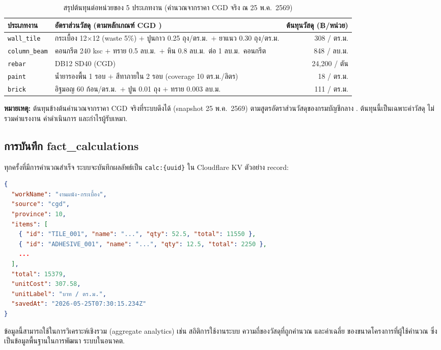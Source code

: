 \begin{table}[H]
\centering
\caption{สรุปต้นทุนต่อหน่วยของ 5 ประเภทงาน (คำนวณจากราคา CGD จริง ณ 25 พ.ค.\ 2569)}
\label{tab:boq-summary}
\begin{tabularx}{\textwidth}{l X r}
\toprule
\textbf{ประเภทงาน} & \textbf{อัตราส่วนวัสดุ (ตามหลักเกณฑ์ CGD \cite{cgd2569})} & \textbf{ต้นทุนวัสดุ (฿/หน่วย)} \\
\midrule
\texttt{wall\_tile}   & กระเบื้อง 12$\times$12 (waste 5\%) $+$ ปูนกาว 0.25 ถุง/ตร.ม.\ $+$ ยาแนว 0.30 ถุง/ตร.ม. & 308 / ตร.ม. \\
\texttt{column\_beam} & คอนกรีต 240 ksc $+$ ทราย 0.5 ลบ.ม.\ $+$ หิน 0.8 ลบ.ม.\ ต่อ 1 ลบ.ม.\ คอนกรีต & 848 / ลบ.ม. \\
\texttt{rebar}        & DB12 SD40 (CGD) & 24{,}200 / ตัน \\
\texttt{paint}        & น้ำยารองพื้น 1 รอบ $+$ สีทาภายใน 2 รอบ (coverage 10 ตร.ม./ลิตร) & 18 / ตร.ม. \\
\texttt{brick}        & อิฐมอญ 60 ก้อน/ตร.ม.\ $+$ ปูน 0.01 ถุง $+$ ทราย 0.003 ลบ.ม. & 111 / ตร.ม. \\
\bottomrule
\end{tabularx}
\end{table}

\textbf{หมายเหตุ:} ต้นทุนข้างต้นคำนวณจากราคา CGD จริงที่ระบบดึงได้ (snapshot 25 พ.ค.\ 2569) ตามสูตรอัตราส่วนวัสดุของกรมบัญชีกลาง \cite{cgd2569}. ต้นทุนนี้เป็นเฉพาะค่าวัสดุ ไม่รวมค่าแรงงาน ค่าดำเนินการ และกำไรผู้รับเหมา.

\subsection{การบันทึก fact\_calculations}

ทุกครั้งที่มีการคำนวณสำเร็จ ระบบจะบันทึกผลลัพธ์เป็น
\texttt{calc:\{uuid\}} ใน Cloudflare KV ตัวอย่าง record:

\begin{lstlisting}[language=json,caption={ตัวอย่าง fact\_calculations record}]
{
  "workName": "งานผนัง-กระเบื้อง",
  "source": "cgd",
  "province": 10,
  "items": [
    { "id": "TILE_001", "name": "...", "qty": 52.5, "total": 11550 },
    { "id": "ADHESIVE_001", "name": "...", "qty": 12.5, "total": 2250 },
    ...
  ],
  "total": 15379,
  "unitCost": 307.58,
  "unitLabel": "บาท / ตร.ม.",
  "savedAt": "2026-05-25T07:30:15.234Z"
}
\end{lstlisting}

ข้อมูลนี้สามารถใช้ในการวิเคราะห์เชิงรวม (aggregate analytics)
เช่น สถิติการใช้งานระบบ ความถี่ของวัสดุที่ถูกคำนวณ และค่าเฉลี่ย
ของขนาดโครงการที่ผู้ใช้คำนวณ ซึ่งเป็นข้อมูลพื้นฐานในการพัฒนา
ระบบในอนาคต.

